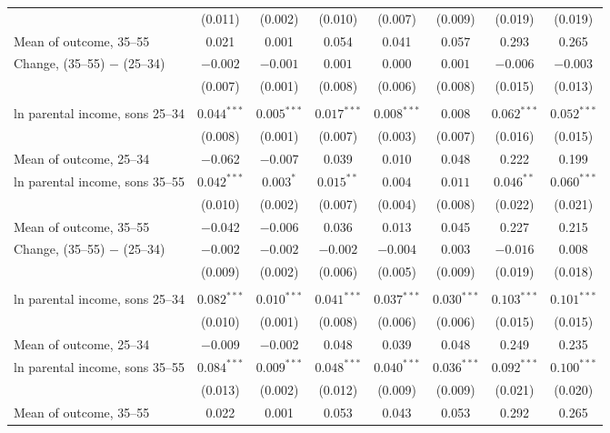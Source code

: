\begin{table}[!htbp]
{{\begin{tabular}{lccccccc}
 & (0.011) & (0.002) & (0.010) & (0.007) & (0.009) & (0.019) & (0.019) \\
\quad Mean of outcome, 35--55 & 0.021 & 0.001 & 0.054 & 0.041 & 0.057 & 0.293 & 0.265 \\
Change, (35--55) $-$ (25--34) & $-0.002$ & $-0.001$ & $0.001$ & $0.000$ & $0.001$ & $-0.006$ & $-0.003$ \\
 & (0.007) & (0.001) & (0.008) & (0.006) & (0.008) & (0.015) & (0.013) \\
\addlinespace
\multicolumn{8}{l}{\textit{Black}} \\
ln parental income, sons 25--34 & $0.044^{***}$ & $0.005^{***}$ & $0.017^{***}$ & $0.008^{***}$ & $0.008$ & $0.062^{***}$ & $0.052^{***}$ \\
 & (0.008) & (0.001) & (0.007) & (0.003) & (0.007) & (0.016) & (0.015) \\
\quad Mean of outcome, 25--34 & $-$0.062 & $-$0.007 & 0.039 & 0.010 & 0.048 & 0.222 & 0.199 \\
ln parental income, sons 35--55 & $0.042^{***}$ & $0.003^{*}$ & $0.015^{**}$ & $0.004$ & $0.011$ & $0.046^{**}$ & $0.060^{***}$ \\
 & (0.010) & (0.002) & (0.007) & (0.004) & (0.008) & (0.022) & (0.021) \\
\quad Mean of outcome, 35--55 & $-$0.042 & $-$0.006 & 0.036 & 0.013 & 0.045 & 0.227 & 0.215 \\
Change, (35--55) $-$ (25--34) & $-0.002$ & $-0.002$ & $-0.002$ & $-0.004$ & $0.003$ & $-0.016$ & $0.008$ \\
 & (0.009) & (0.002) & (0.006) & (0.005) & (0.009) & (0.019) & (0.018) \\
\addlinespace
\multicolumn{8}{l}{\textit{White}} \\
ln parental income, sons 25--34 & $0.082^{***}$ & $0.010^{***}$ & $0.041^{***}$ & $0.037^{***}$ & $0.030^{***}$ & $0.103^{***}$ & $0.101^{***}$ \\
 & (0.010) & (0.001) & (0.008) & (0.006) & (0.006) & (0.015) & (0.015) \\
\quad Mean of outcome, 25--34 & $-$0.009 & $-$0.002 & 0.048 & 0.039 & 0.048 & 0.249 & 0.235 \\
ln parental income, sons 35--55 & $0.084^{***}$ & $0.009^{***}$ & $0.048^{***}$ & $0.040^{***}$ & $0.036^{***}$ & $0.092^{***}$ & $0.100^{***}$ \\
 & (0.013) & (0.002) & (0.012) & (0.009) & (0.009) & (0.021) & (0.020) \\
\quad Mean of outcome, 35--55 & 0.022 & 0.001 & 0.053 & 0.043 & 0.053 & 0.292 & 0.265 \\

\end{tabular}}}
\end{table}
